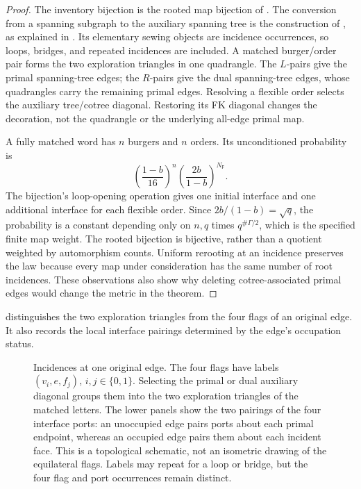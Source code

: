 \begin{proof}
The inventory bijection is the rooted map bijection of
\cite[Sections 4.1--4.2]{SheffieldInventory}.  The conversion from a
spanning subgraph to the auxiliary spanning tree is the construction of
\citet[Section~4]{Bernardi2008Subgraphs}, as explained in
\citet[Section~4.1]{SheffieldInventory}.  Its elementary sewing objects
are incidence occurrences, so loops, bridges, and repeated incidences are
included.  A matched burger/order pair forms the two exploration triangles
in one quadrangle.  The $L$-pairs give the primal spanning-tree edges;
the $R$-pairs give the dual spanning-tree edges, whose quadrangles carry the
remaining primal edges.  Resolving a flexible order selects the auxiliary
tree/cotree diagonal.  Restoring its FK diagonal changes the decoration,
not the quadrangle or the underlying all-edge primal map.

A fully matched word has $n$ burgers and $n$ orders.  Its unconditioned
probability is
\[
 \left(\frac{1-b}{16}\right)^n
 \left(\frac{2b}{1-b}\right)^{N_{\mathsf F}}.
\]
The bijection's loop-opening operation gives one initial interface and one
additional interface for each flexible order.  Since
$2b/(1-b)=\sqrt q$, the probability is a constant depending only on $n,q$
times $q^{\#\Gamma/2}$, which is the specified finite map weight.
The rooted bijection is bijective, rather than a quotient weighted by
automorphism counts.  Uniform rerooting at an incidence preserves the law
because every map under consideration has the same number of root
incidences.  These observations also show why deleting cotree-associated
primal edges would change the metric in the theorem.
\end{proof}

 distinguishes the two exploration triangles
from the four flags of an original edge.  It also records the local
interface pairings determined by the edge's occupation status.

\begin{figure}[ht]
\centering

\caption{Incidences at one original edge.  The four flags have labels
$(v_i,e,f_j)$, $i,j\in\{0,1\}$.  Selecting the primal or dual auxiliary
diagonal groups them into the two exploration triangles of the matched
letters.  The lower panels show the two pairings of the four interface
ports: an unoccupied edge pairs ports about each primal endpoint,
whereas an occupied edge pairs them about each incident face.
This is a topological schematic, not an isometric drawing of the
equilateral flags.  Labels may repeat for a loop or bridge, but the
four flag and port occurrences remain distinct.}
\label{enc:flag-quadrangle}
\end{figure}


